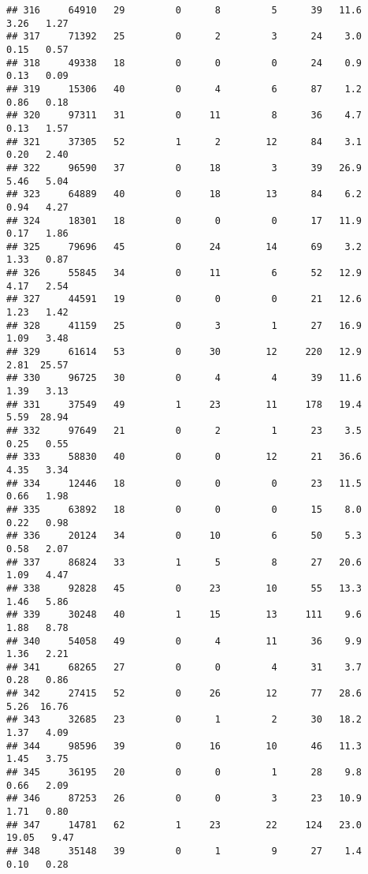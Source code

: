 \documentclass[
]{article}
\begin{document}
\begin{verbatim}
## 316     64910   29         0      8         5      39   11.6    3.26   1.27
## 317     71392   25         0      2         3      24    3.0    0.15   0.57
## 318     49338   18         0      0         0      24    0.9    0.13   0.09
## 319     15306   40         0      4         6      87    1.2    0.86   0.18
## 320     97311   31         0     11         8      36    4.7    0.13   1.57
## 321     37305   52         1      2        12      84    3.1    0.20   2.40
## 322     96590   37         0     18         3      39   26.9    5.46   5.04
## 323     64889   40         0     18        13      84    6.2    0.94   4.27
## 324     18301   18         0      0         0      17   11.9    0.17   1.86
## 325     79696   45         0     24        14      69    3.2    1.33   0.87
## 326     55845   34         0     11         6      52   12.9    4.17   2.54
## 327     44591   19         0      0         0      21   12.6    1.23   1.42
## 328     41159   25         0      3         1      27   16.9    1.09   3.48
## 329     61614   53         0     30        12     220   12.9    2.81  25.57
## 330     96725   30         0      4         4      39   11.6    1.39   3.13
## 331     37549   49         1     23        11     178   19.4    5.59  28.94
## 332     97649   21         0      2         1      23    3.5    0.25   0.55
## 333     58830   40         0      0        12      21   36.6    4.35   3.34
## 334     12446   18         0      0         0      23   11.5    0.66   1.98
## 335     63892   18         0      0         0      15    8.0    0.22   0.98
## 336     20124   34         0     10         6      50    5.3    0.58   2.07
## 337     86824   33         1      5         8      27   20.6    1.09   4.47
## 338     92828   45         0     23        10      55   13.3    1.46   5.86
## 339     30248   40         1     15        13     111    9.6    1.88   8.78
## 340     54058   49         0      4        11      36    9.9    1.36   2.21
## 341     68265   27         0      0         4      31    3.7    0.28   0.86
## 342     27415   52         0     26        12      77   28.6    5.26  16.76
## 343     32685   23         0      1         2      30   18.2    1.37   4.09
## 344     98596   39         0     16        10      46   11.3    1.45   3.75
## 345     36195   20         0      0         1      28    9.8    0.66   2.09
## 346     87253   26         0      0         3      23   10.9    1.71   0.80
## 347     14781   62         1     23        22     124   23.0   19.05   9.47
## 348     35148   39         0      1         9      27    1.4    0.10   0.28

\end{verbatim}
\end{document}
